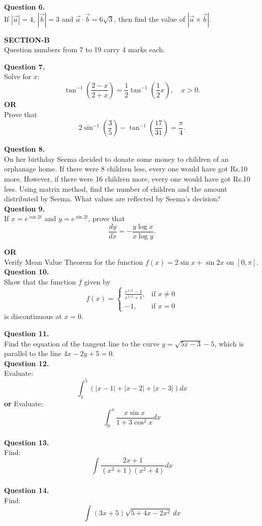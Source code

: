 \documentclass[12pt]{article} \usepackage[utf8]{inputenc}
\begin{document}
\textbf{Question 6.} \\
If $|\vec{a}| = 4$, $|\vec{b}| = 3$ and $\vec{a} \cdot \vec{b} = 6\sqrt{3}$, then find the value of $|\vec{a} \times \vec{b}|$. \\[1em]
\begin{center}
\Large\textbf{SECTION-B}\\
\normalsize
Question numbers from 7 to 19 carry 4 marks each.
\end{center}
\textbf{Question 7.} \\
Solve for $x$: 
\[
\tan^{-1} \left( \frac{2 - x}{2 + x} \right) = \frac{1}{2} \tan^{-1} \left( \frac{1}{2}x \right), \quad x > 0.
\]
\textbf{OR} \\
Prove that
\[
2 \sin^{-1} \left( \frac{3}{5} \right) - \tan^{-1} \left( \frac{17}{31} \right) = \frac{\pi}{4}.
\]

\textbf{Question 8.} \\
On her birthday Seema decided to donate some money to children of an orphanage home. If there were 8 children less, every one would have got  Rs.10 more. However, if there were 16 children more, every one would have got Rs.10 less. Using matrix method, find the number of children and the amount distributed by Seema. What values are reflected by Seema’s decision? \\[1em]

\textbf{Question 9.} \\
If $x = e^{\cos 2t}$ and $y = e^{\sin 2t}$, prove that 
\[
\frac{dy}{dx} = -\frac{y \log x}{x \log y}.
\]

\textbf{OR} \\
Verify Mean Value Theorem for the function $f(x) = 2 \sin x + \sin 2x$ on $[0, \pi]$. \\[1em]

\textbf{Question 10.} \\
Show that the function $f$ given by
\[
f(x) =
\begin{cases}
\frac{e^{1/x}-1}{e^{1/x} +
 1}, & \text{if } x \ne 0 \\
-1, & \text{if } x = 0
\end{cases}
\]
is discontinuous at $x = 0$.

\textbf{Question 11.} \\
Find the equation of the tangent line to the curve $y = \sqrt{5x - 3} - 5$, which is parallel to the line $4x - 2y + 5 = 0$. \\[1em]

\textbf{Question 12.} \\
Evaluate:
\[
\int_1^5 \left( |x - 1| + |x - 2| + |x - 3| \right) dx
\]
\textbf{or}
Evaluate:
\[
\int_0^{\pi} \frac{x \sin x}{1 + 3 \cos^2 x} dx
\] \\[1em]

\textbf{Question 13.} \\
Find:
\[
\int \frac{2x + 1}{(x^2 + 1)(x^2 + 4)} dx
\] \\[1em]
\textbf{Question 14.} \\
Find:
\[
\int (3x + 5)\sqrt{5 + 4x - 2x^2} \, dx
\]
\end{document}
